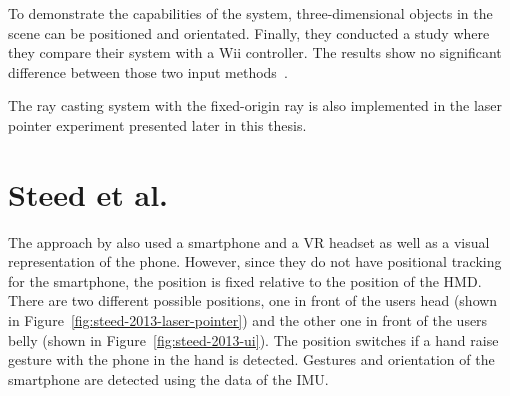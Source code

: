To demonstrate the capabilities of the system, three-dimensional objects in the scene can be positioned and orientated. Finally, they conducted a study where they compare their system with a Wii controller. The results show no significant difference between those two input methods~\cite[125]{Pietroszek.2014}.

The ray casting system with the fixed-origin ray is also implemented in the laser pointer experiment presented later in this thesis.%


\section{Steed et al.}\label{section:steed-2013}
The approach by \citeauthor{Steed.2013} also used a smartphone and a \gls{VR} headset as well as a visual representation of the phone. However, since they do not have positional tracking for the smartphone, the position is fixed relative to the position of the \gls{HMD}. There are two different possible positions, one in front of the users head (shown in Figure~\ref{fig:steed-2013-laser-pointer}) and the other one in front of the users belly (shown in Figure~\ref{fig:steed-2013-ui}). The position switches if a hand raise gesture with the phone in the hand is detected. Gestures and orientation of the smartphone are detected using the data of the \gls{IMU}.

